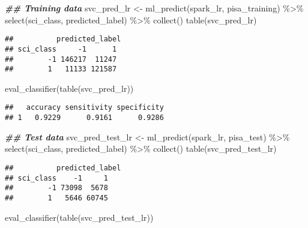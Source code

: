 \documentclass[
]{book}
\newenvironment{Shaded}{\begin{snugshade}}{\end{snugshade}}
\newcommand{\DocumentationTok}[1]{\textcolor[rgb]{0.56,0.35,0.01}{\textbf{\textit{#1}}}}
\newcommand{\FunctionTok}[1]{\textcolor[rgb]{0.00,0.00,0.00}{#1}}
\newcommand{\NormalTok}[1]{#1}
\newcommand{\OtherTok}[1]{\textcolor[rgb]{0.56,0.35,0.01}{#1}}
\newcommand{\SpecialCharTok}[1]{\textcolor[rgb]{0.00,0.00,0.00}{#1}}
\begin{document}
\begin{Shaded}
\begin{Highlighting}[]
\DocumentationTok{\#\# Training data }
\NormalTok{svc\_pred\_lr }\OtherTok{\textless{}{-}} \FunctionTok{ml\_predict}\NormalTok{(spark\_lr, pisa\_training) }\SpecialCharTok{\%\textgreater{}\%} 
  \FunctionTok{select}\NormalTok{(sci\_class, predicted\_label) }\SpecialCharTok{\%\textgreater{}\%} 
  \FunctionTok{collect}\NormalTok{()}
\FunctionTok{table}\NormalTok{(svc\_pred\_lr)}
\end{Highlighting}
\end{Shaded}

\begin{verbatim}
##          predicted_label
## sci_class     -1      1
##        -1 146217  11247
##        1   11133 121587
\end{verbatim}

\begin{Shaded}
\begin{Highlighting}[]
\FunctionTok{eval\_classifier}\NormalTok{(}\FunctionTok{table}\NormalTok{(svc\_pred\_lr))}
\end{Highlighting}
\end{Shaded}

\begin{verbatim}
##   accuracy sensitivity specificity
## 1   0.9229      0.9161      0.9286
\end{verbatim}

\begin{Shaded}
\begin{Highlighting}[]
\DocumentationTok{\#\# Test data}
\NormalTok{svc\_pred\_test\_lr }\OtherTok{\textless{}{-}} \FunctionTok{ml\_predict}\NormalTok{(spark\_lr, pisa\_test) }\SpecialCharTok{\%\textgreater{}\%} 
  \FunctionTok{select}\NormalTok{(sci\_class, predicted\_label) }\SpecialCharTok{\%\textgreater{}\%} 
  \FunctionTok{collect}\NormalTok{()}
\FunctionTok{table}\NormalTok{(svc\_pred\_test\_lr)}
\end{Highlighting}
\end{Shaded}

\begin{verbatim}
##          predicted_label
## sci_class    -1     1
##        -1 73098  5678
##        1   5646 60745
\end{verbatim}

\begin{Shaded}
\begin{Highlighting}[]
\FunctionTok{eval\_classifier}\NormalTok{(}\FunctionTok{table}\NormalTok{(svc\_pred\_test\_lr))}
\end{Highlighting}
\end{Shaded}
\end{document}
